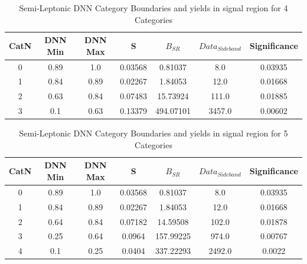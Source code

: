 \begin{table}[H]
  \begin{center}
    \begin{tabular}{c|c|c|c|c|c|c}
    CatN & DNN Min & DNN Max & S & $B_{SR}$ & $Data_{Sideband}$ & Significance\\ \hline
    0 & 0.89 & 1.0 & 0.03568 & 0.81037 & 8.0 & 0.03935 \\ 
    1 & 0.84 & 0.89 & 0.02267 & 1.84053 & 12.0 & 0.01668 \\ 
    2 & 0.63 & 0.84 & 0.07483 & 15.73924 & 111.0 & 0.01885 \\ 
    3 & 0.1 & 0.63 & 0.13379 & 494.07101 & 3457.0 & 0.00602 \\ 
    \end{tabular}
  \end{center}
\caption{
    Semi-Leptonic DNN Category Boundaries and yields in signal region for 4 Categories
}
\label{tab:SLcategories_4}
\end{table}
 
\begin{table}[H]
  \begin{center}
    \begin{tabular}{c|c|c|c|c|c|c}
    CatN & DNN Min & DNN Max & S & $B_{SR}$ & $Data_{Sideband}$ & Significance\\ \hline
    0 & 0.89 & 1.0 & 0.03568 & 0.81037 & 8.0 & 0.03935 \\ 
    1 & 0.84 & 0.89 & 0.02267 & 1.84053 & 12.0 & 0.01668 \\ 
    2 & 0.64 & 0.84 & 0.07182 & 14.59508 & 102.0 & 0.01878 \\ 
    3 & 0.25 & 0.64 & 0.0964 & 157.99225 & 974.0 & 0.00767 \\ 
    4 & 0.1 & 0.25 & 0.0404 & 337.22293 & 2492.0 & 0.0022 \\ 
    \end{tabular}
  \end{center}
\caption{
    Semi-Leptonic DNN Category Boundaries and yields in signal region for 5 Categories
}
\label{tab:SLcategories_5}
\end{table}

\newpage 

